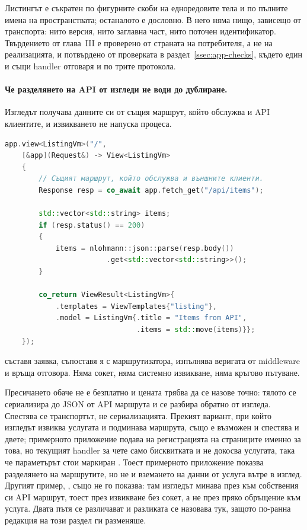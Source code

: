 Листингът е съкратен по фигурните скоби на едноредовите тела и по пълните имена на
пространствата; останалото е дословно. В него няма нищо, зависещо от транспорта: нито
версия, нито заглавна част, нито поточен идентификатор. Твърдението от глава~III е
проверено от страната на потребителя, а не на реализацията, и потвърдено от проверката в
раздел~\ref{ssec:app-checks}, където един и същи handler отговаря и по трите протокола.

\paragraph{Че разделянето на API от изгледи не води до дублиране.} Изгледът получава
данните си от същия маршрут, който обслужва и API клиентите, и извикването не напуска
процеса.

\begin{lstlisting}[language=C++,caption={Изглед, който взема данните си от API маршрут в същия процес},label={lst:app-view}]
app.view<ListingVm>("/",
    [&app](Request&) -> View<ListingVm>
    {
        // Същият маршрут, който обслужва и външните клиенти.
        Response resp = co_await app.fetch_get("/api/items");

        std::vector<std::string> items;
        if (resp.status() == 200)
        {
            items = nlohmann::json::parse(resp.body())
                        .get<std::vector<std::string>>();
        }

        co_return ViewResult<ListingVm>{
            .templates = ViewTemplates{"listing"},
            .model = ListingVm{.title = "Items from API",
                               .items = std::move(items)}};
    });
\end{lstlisting}

 съставя заявка, съпоставя я с маршрутизатора, изпълнява веригата от
middleware и връща отговора. Няма сокет, няма системно извикване, няма кръгово пътуване.

Пресичането обаче не е безплатно и цената трябва да се назове точно: тялото се сериализира
до JSON от API маршрута и се разбира обратно от изгледа. Спестява се транспортът, не
сериализацията. Прекият вариант, при който изгледът извиква услугата и подминава маршрута,
също е възможен и спестява и двете; примерното приложение подава  на
регистрацията на страниците именно за това, но текущият handler за \code{/} чете само
бисквитката и не докосва услугата, така че параметърът стои маркиран
. Тоест примерното приложение показва разделянето на маршрутите, но
не и вземането на данни от услуга вътре в изглед. Другият пример,
, също не го показва: там изгледът минава през
 към собствения си API маршрут, тоест през извикване без сокет, а не през
пряко обръщение към услуга. Двата пътя се различават и разликата се назовава тук, защото
по-ранна редакция на този раздел ги разменяше.

